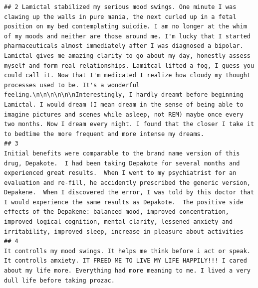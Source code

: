 \documentclass[spanish,]{article}
\begin{document}
\begin{verbatim}
## 2 Lamictal stabilized my serious mood swings. One minute I was clawing up the walls in pure mania, the next curled up in a fetal position on my bed contemplating suicdie. I am no longer at the whim of my moods and neither are those around me. I'm lucky that I started pharmaceuticals almost immediately after I was diagnosed a bipolar. Lamictal gives me amazing clarity to go about my day, honestly assess myself and form real relationships. Lamitcal lifted a fog, I guess you could call it. Now that I'm medicated I realize how cloudy my thought processes used to be. It's a wonderful feeling.\n\n\n\n\n\nInterestingly, I hardly dreamt before beginning Lamictal. I would dream (I mean dream in the sense of being able to imagine pictures and scenes while asleep, not REM) maybe once every two months. Now I dream every night. I found that the closer I take it to bedtime the more frequent and more intense my dreams.
## 3                                                                                                                                                                                                                                                                                                                       Initial benefits were comparable to the brand name version of this drug, Depakote.  I had been taking Depakote for several months and experienced great results.  When I went to my psychiatrist for an evaluation and re-fill, he accidently prescribed the generic version, Depakene.  When I discovered the error, I was told by this doctor that I would experience the same results as Depakote.  The positive side effects of the Depakene: balanced mood, improved concentration, improved logical cognition, mental clarity, lessened anxiety and irritability, improved sleep, increase in pleasure about activities
## 4                                                                                                                                                                                                                                                                                                                                                                                                                                                                                                                                                                                                                                                                                                    It controlls my mood swings. It helps me think before i act or speak. It controlls amxiety. IT FREED ME TO LIVE MY LIFE HAPPILY!!! I cared about my life more. Everything had more meaning to me. I lived a very dull life before taking prozac.

\end{verbatim}
\end{document}
